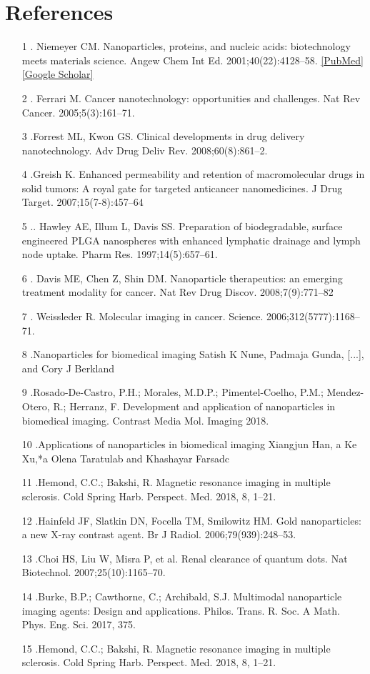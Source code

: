 \documentclass[12pt]{article}
\begin{document}
\section*{References}
\begin{itemize}
\item [1]. Niemeyer CM. Nanoparticles, proteins, and nucleic acids: biotechnology meets materials science. Angew Chem Int Ed. 2001;40(22):4128–58. \url{[PubMed] [Google Scholar]}
\item [2]. Ferrari M. Cancer nanotechnology: opportunities and challenges. Nat Rev Cancer. 2005;5(3):161–71.
\item [3].Forrest ML, Kwon GS. Clinical developments in drug delivery nanotechnology. Adv Drug Deliv Rev. 2008;60(8):861–2. 
\item [4].Greish K. Enhanced permeability and retention of macromolecular drugs in solid tumors: A royal gate for targeted anticancer nanomedicines. J Drug Target. 2007;15(7-8):457–64
\item [5].. Hawley AE, Illum L, Davis SS. Preparation of biodegradable, surface engineered PLGA nanospheres with enhanced lymphatic drainage and lymph node uptake. Pharm Res. 1997;14(5):657–61. 
\item [6]. Davis ME, Chen Z, Shin DM. Nanoparticle therapeutics: an emerging treatment modality for cancer. Nat Rev Drug Discov. 2008;7(9):771–82
\item [7]. Weissleder R. Molecular imaging in cancer. Science. 2006;312(5777):1168–71.
\item [8].Nanoparticles for biomedical imaging Satish K Nune, Padmaja Gunda, [...], and Cory J Berkland
\item [9].Rosado-De-Castro, P.H.; Morales, M.D.P.; Pimentel-Coelho, P.M.; Mendez-Otero, R.; Herranz, F. Development and application of nanoparticles in biomedical imaging. Contrast Media Mol. Imaging 2018.
\item [10].Applications of nanoparticles in biomedical imaging Xiangjun Han, a Ke Xu,*a Olena Taratulab and Khashayar Farsadc
\item [11].Hemond, C.C.; Bakshi, R. Magnetic resonance imaging in multiple sclerosis. Cold Spring Harb. Perspect. Med. 2018, 8, 1–21.
\item[12].Hainfeld JF, Slatkin DN, Focella TM, Smilowitz HM. Gold nanoparticles: a new X-ray contrast agent. Br J Radiol. 2006;79(939):248–53.
\item [13].Choi HS, Liu W, Misra P, et al. Renal clearance of quantum dots. Nat Biotechnol. 2007;25(10):1165–70.
\item [14].Burke, B.P.; Cawthorne, C.; Archibald, S.J. Multimodal nanoparticle imaging agents: Design and applications. Philos. Trans. R. Soc. A Math. Phys. Eng. Sci. 2017, 375.
\item [15].Hemond, C.C.; Bakshi, R. Magnetic resonance imaging in multiple sclerosis. Cold Spring Harb. Perspect. Med. 2018, 8, 1–21.

\end{itemize}






 
\end{document}
